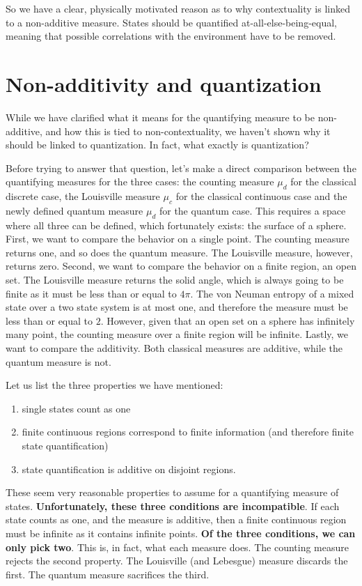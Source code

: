 \documentclass[10pt,twocolumn, nofootinbib]{revtex4-2}
\begin{document}
So we have a clear, physically motivated reason as to why contextuality is linked to a non-additive measure. States should be quantified at-all-else-being-equal, meaning that possible correlations with the environment have to be removed.

\section{Non-additivity and quantization}

While we have clarified what it means for the quantifying measure to be non-additive, and how this is tied to non-contextuality, we haven't shown why it should be linked to quantization. In fact, what exactly is quantization?

Before trying to answer that question, let's make a direct comparison between the quantifying measures for the three cases: the counting measure $\mu_d$ for the classical discrete case, the Louisville measure $\mu_c$ for the classical continuous case and the newly defined quantum measure $\mu_d$ for the quantum case. This requires a space where all three can be defined, which fortunately exists: the surface of a sphere. First, we want to compare the behavior on a single point. The counting measure returns one, and so does the quantum measure. The Louisville measure, however, returns zero. Second, we want to compare the behavior on a finite region, an open set. The Louisville measure returns the solid angle, which is always going to be finite as it must be less than or equal to $4\pi$. The von Neuman entropy of a mixed state over a two state system is at most one, and therefore the measure must be less than or equal to $2$. However, given that an open set on a sphere has infinitely many point, the counting measure over a finite region will be infinite. Lastly, we want to compare the additivity. Both classical measures are additive, while the quantum measure is not.

Let us list the three properties we have mentioned:
\begin{enumerate}
	\item single states count as one
	\item finite continuous regions correspond to finite information (and therefore finite state quantification)
	\item state quantification is additive on disjoint regions.
\end{enumerate}
These seem very reasonable properties to assume for a quantifying measure of states. \textbf{Unfortunately, these three conditions are incompatible}. If each state counts as one, and the measure is additive, then a finite continuous region must be infinite as it contains infinite points. \textbf{Of the three conditions, we can only pick two}. This is, in fact, what each measure does. The counting measure rejects the second property. The Louisville (and Lebesgue) measure discards the first. The quantum measure sacrifices the third.
\end{document}
